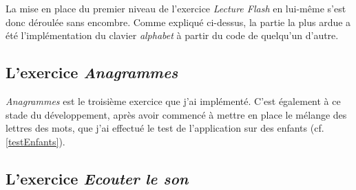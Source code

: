 La mise en place du premier niveau de l'exercice \textit{Lecture Flash} en lui-même s'est donc déroulée sans encombre. Comme expliqué ci-dessus, la partie la plus ardue a été l'implémentation du clavier \textit{alphabet} à partir du code de quelqu'un d'autre.
	
\subsection{L'exercice \textit{Anagrammes}}
\textit{Anagrammes} est le troisième exercice que j'ai implémenté. C'est également à ce stade du développement, après avoir commencé à mettre en place le mélange des lettres des mots, que j'ai effectué le test de l'application sur des enfants (cf. \ref{testEnfants}).

\subsection{L'exercice \textit{Ecouter le son}}


